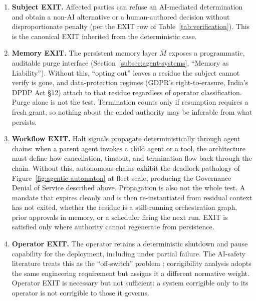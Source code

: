 \documentclass{article}
\theoremstyle{definition}
\begin{document}
\begin{enumerate}[noitemsep]
    \item \textbf{Subject EXIT.} Affected parties can refuse an AI-mediated determination and obtain a non-AI alternative or a human-authored decision without disproportionate penalty (per the EXIT row of Table~\ref{tab:verification}). This is the canonical EXIT inherited from the deterministic case.
    \item \textbf{Memory EXIT.} The persistent memory layer $\bar{M}$ exposes a programmatic, auditable purge interface (Section~\ref{subsec:agent-systems}, ``Memory as Liability''). Without this, ``opting out'' leaves a residue the subject cannot verify is gone, and data-protection regimes (GDPR's right-to-erasure, India's DPDP Act §12) attach to that residue regardless of operator classification. Purge alone is not the test. Termination counts only if resumption requires a fresh grant, so nothing about the ended authority may be inferable from what persists.
    \item \textbf{Workflow EXIT.} Halt signals propagate deterministically through agent chains: when a parent agent invokes a child agent or a tool, the architecture must define how cancellation, timeout, and termination flow back through the chain. Without this, autonomous chains exhibit the deadlock pathology of Figure~\ref{fig:agentic-automaton} at fleet scale, producing the Governance Denial of Service described above. Propagation is also not the whole test. A mandate that expires cleanly and is then re-instantiated from residual context has not exited, whether the residue is a still-running orchestration graph, prior approvals in memory, or a scheduler firing the next run. EXIT is satisfied only where authority cannot regenerate from persistence.
    \item \textbf{Operator EXIT.} The operator retains a deterministic shutdown and pause capability for the deployment, including under partial failure. The AI-safety literature treats this as the ``off-switch'' problem \citep{hadfield2017}; corrigibility analysis adopts the same engineering requirement but assigns it a different normative weight. Operator EXIT is necessary but not sufficient: a system corrigible only to its operator is not corrigible to those it governs.

\end{enumerate}
\end{document}
